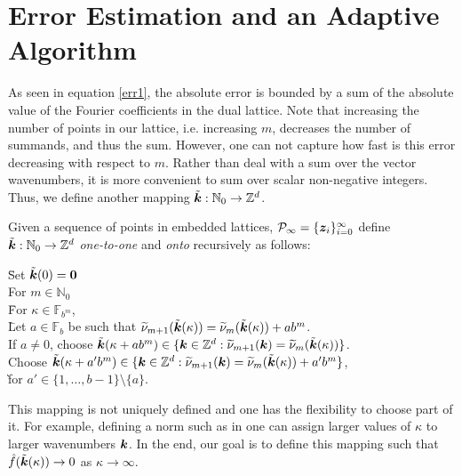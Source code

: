 \documentclass[graybox]{svmult}
\newcommand{\Z}{\mathbb{Z}} %
\newcommand{\N}{\mathbb{N}} %
\newcommand{\F}{\mathbb{F}} %
\newcommand{\bszero}{\boldsymbol{0}} %
\newcommand{\bsz}{\boldsymbol{z}}    %
\begin{document}
\section{Error Estimation and an Adaptive Algorithm}\label{secalgo}

As seen in equation \eqref{err1}, the absolute error is bounded by a sum of the absolute value of the Fourier coefficients in the dual lattice. Note that increasing the number of points in our lattice, i.e. increasing $m$, decreases the number of summands, and thus the sum. However, one can not capture how fast is this error decreasing with respect to $m$.  Rather than deal with a sum over the vector wavenumbers, it is more convenient to sum over scalar non-negative integers.  Thus, we define another mapping $\tvk: \N_0 \to \Z^d$.

\begin{definition} \label{wavenummapdef} Given a sequence of points in embedded lattices, $\cp_{\infty} = \{\bsz_i\}_{i=0}^{\infty}$ define $\tvk: \N_0 \to \Z^d$ \emph{one-to-one} and \emph{onto} recursively as follows:
\begin{tabbing}
\hspace{0.5cm} \= Set $\tvk(0)=\bszero$ \+ \\
For $m\in \N_0$ \\
\hspace{0.3cm} \= For $\kappa \in \F_{b^m}$,  \+ \\
\hspace{0.3cm} \= Let $a\in \F_b$ be such that $\widetilde{\nu}_{m+1}(\tilde{\boldsymbol{k}}(\kappa))= \widetilde{\nu}_{m}(\tilde{\boldsymbol{k}}(\kappa)) + ab^m$. \+ \\
If $a\ne 0$, choose $\tvk(\kappa+a b^m) \in \{\bsk \in  \Z^d : \tnu_{m+1}(\bsk)=\tnu_{m}(\tvk(\kappa))\}$. \\
Choose $\tvk(\kappa+a' b^m) \in \{\bsk \in  \Z^d : \tnu_{m+1}(\bsk)=\tnu_{m}(\tvk(\kappa))+a' b^m \}$, \\ \` for  $a'\in \{1, \ldots, b-1\}\setminus \{a\}$.
\end{tabbing}
\end{definition}

This mapping is not uniquely defined and one has the flexibility to choose part of it. For example, defining a norm such as in \cite[Chap. 4]{SloJoe94} one can assign larger values of $\kappa$ to larger wavenumbers $\boldsymbol{k}$. In the end, our goal is to define this mapping such that $\hat{f}(\tilde{\boldsymbol{k}}(\kappa))\rightarrow 0$ as $\kappa \to \infty$.
\end{document}
